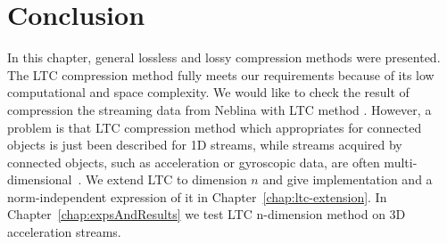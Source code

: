 \section{Conclusion}


In this chapter, general lossless and lossy compression methods were presented. The
LTC compression method fully meets our requirements because of its low
computational and space complexity. We would like to check the result of
compression the streaming data from Neblina with LTC method . However, a problem
is that LTC compression method which appropriates for connected objects is just
been described for 1D streams, while streams acquired by connected objects, such
as acceleration or gyroscopic data, are often
multi-dimensional~\cite{li2018multi}. We extend LTC to dimension $n$ and give
implementation and a norm-independent expression of it in
Chapter~\ref{chap:ltc-extension}. In Chapter~\ref{chap:expsAndResults} we test
LTC n-dimension method on 3D acceleration streams.
